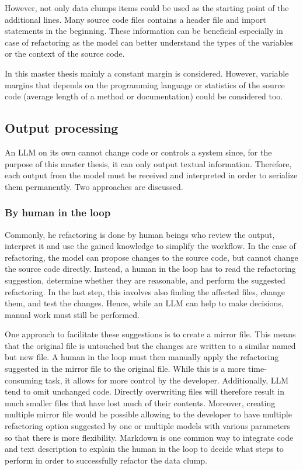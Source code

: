 However, not only data clumps items could be used as the starting point of the additional lines. Many source code files contains a header file and import statements in the beginning. These information can be beneficial especially in case of refactoring as the model can better understand the types of the variables or the context of the source code.

In this master thesis mainly a constant margin is considered. However, variable margins that depends on the programming language or statistics of the source code (average length of a method or documentation) could be considered too.





\subsection{Output processing}
An \ac{LLM} on its own cannot change code or controls a system since, for the purpose of this master thesis, it  can only output textual information. Therefore, each output from the model must be received and interpreted  in order to serialize them permanently. Two approaches are discussed. 

\subsubsection{By human in the loop}
Commonly, he refactoring is done by human beings who review the output, interpret it and use the gained knowledge to simplify the workflow. In the case of refactoring, the model can propose changes to the source code, but cannot change the source code directly. Instead, a human in the loop has to read the refactoring suggestion, determine whether they are reasonable, and perform the suggested refactoring. In the last step, this involves also finding the affected files, change them, and test the changes. Hence, while an \ac{LLM} can help to make decisions, manual work must still be performed. 

One approach to facilitate these suggestions is to create a mirror file. This means that the original file is untouched but the changes are written to a similar named but new file. A human in the loop must then manually apply the refactoring suggested in the mirror file to the original file. While this is a more time-consuming task, it allows for more control by the developer. Additionally, \acs{LLM} tend to omit unchanged code. Directly overwriting files will therefore result in much smaller files that have lost much of their contents. Moreover, creating multiple mirror file would be possible allowing to the developer to have multiple refactoring option suggested by one or multiple models with various parameters so that there is more flexibility. 
Markdown is one common way to integrate code and text description to explain the human in the loop to decide what steps to perform in order to successfully refactor the data clump.  

